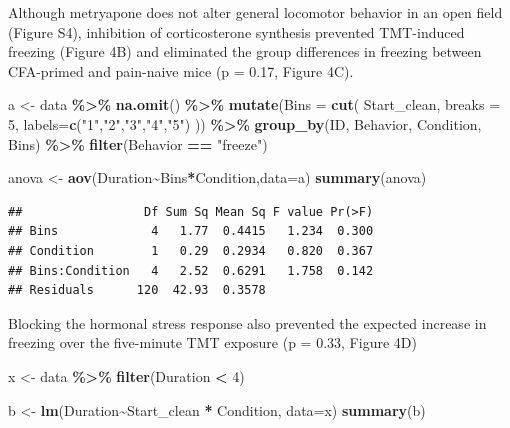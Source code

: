 \documentclass[
]{book}
\newenvironment{Shaded}{\begin{snugshade}}{\end{snugshade}}
\newcommand{\AttributeTok}[1]{\textcolor[rgb]{0.13,0.29,0.53}{#1}}
\newcommand{\DecValTok}[1]{\textcolor[rgb]{0.00,0.00,0.81}{#1}}
\newcommand{\FunctionTok}[1]{\textcolor[rgb]{0.13,0.29,0.53}{\textbf{#1}}}
\newcommand{\NormalTok}[1]{#1}
\newcommand{\OtherTok}[1]{\textcolor[rgb]{0.56,0.35,0.01}{#1}}
\newcommand{\SpecialCharTok}[1]{\textcolor[rgb]{0.81,0.36,0.00}{\textbf{#1}}}
\newcommand{\StringTok}[1]{\textcolor[rgb]{0.31,0.60,0.02}{#1}}
\begin{document}
Although metryapone does not alter general locomotor behavior in an open field (Figure S4), inhibition of corticosterone synthesis prevented TMT-induced freezing (Figure 4B) and eliminated the group differences in freezing between CFA-primed and pain-naive mice (p = 0.17, Figure 4C).

\begin{Shaded}
\begin{Highlighting}[]
\NormalTok{a }\OtherTok{\textless{}{-}}\NormalTok{ data }\SpecialCharTok{\%\textgreater{}\%}
  \FunctionTok{na.omit}\NormalTok{() }\SpecialCharTok{\%\textgreater{}\%}
  \FunctionTok{mutate}\NormalTok{(}\AttributeTok{Bins =} \FunctionTok{cut}\NormalTok{(}
\NormalTok{    Start\_clean,}
    \AttributeTok{breaks =} \DecValTok{5}\NormalTok{,}
    \AttributeTok{labels=}\FunctionTok{c}\NormalTok{(}\StringTok{"1"}\NormalTok{,}\StringTok{"2"}\NormalTok{,}\StringTok{"3"}\NormalTok{,}\StringTok{"4"}\NormalTok{,}\StringTok{"5"}\NormalTok{)}
\NormalTok{  )) }\SpecialCharTok{\%\textgreater{}\%}
  \FunctionTok{group\_by}\NormalTok{(ID, Behavior, Condition, Bins) }\SpecialCharTok{\%\textgreater{}\%}
  \FunctionTok{filter}\NormalTok{(Behavior }\SpecialCharTok{==} \StringTok{"freeze"}\NormalTok{)}

\NormalTok{anova }\OtherTok{\textless{}{-}} \FunctionTok{aov}\NormalTok{(Duration}\SpecialCharTok{\textasciitilde{}}\NormalTok{Bins}\SpecialCharTok{*}\NormalTok{Condition,}\AttributeTok{data=}\NormalTok{a)}
\FunctionTok{summary}\NormalTok{(anova)}
\end{Highlighting}
\end{Shaded}

\begin{verbatim}
##                 Df Sum Sq Mean Sq F value Pr(>F)
## Bins             4   1.77  0.4415   1.234  0.300
## Condition        1   0.29  0.2934   0.820  0.367
## Bins:Condition   4   2.52  0.6291   1.758  0.142
## Residuals      120  42.93  0.3578
\end{verbatim}

Blocking the hormonal stress response also prevented the expected increase in freezing over the five-minute TMT exposure (p = 0.33, Figure 4D)

\begin{Shaded}
\begin{Highlighting}[]
\NormalTok{x }\OtherTok{\textless{}{-}}\NormalTok{ data }\SpecialCharTok{\%\textgreater{}\%}
  \FunctionTok{filter}\NormalTok{(Duration }\SpecialCharTok{\textless{}} \DecValTok{4}\NormalTok{)}

\NormalTok{b }\OtherTok{\textless{}{-}} \FunctionTok{lm}\NormalTok{(Duration}\SpecialCharTok{\textasciitilde{}}\NormalTok{Start\_clean }\SpecialCharTok{*}\NormalTok{ Condition, }\AttributeTok{data=}\NormalTok{x)}
\FunctionTok{summary}\NormalTok{(b)}
\end{Highlighting}
\end{Shaded}
\end{document}
